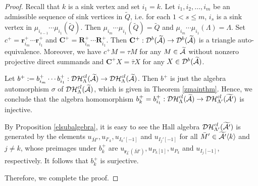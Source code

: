 \documentclass[reqno,12pt]{amsart}
\numberwithin{equation}{section}
\theoremstyle{plain} %
\theoremstyle{definition} %
\begin{document}
\begin{proof}
Recall that $k$ is a sink vertex and set $i_1=k$. Let $i_1,i_2,\ldots, i_m$ be an admissible sequence of sink vertices in $\widetilde{Q}$, i.e. for each $1<s\leq m$, $i_s$ is a sink vertex in $\mu_{i_{s-1}}\cdots \mu_{i_1}(\widetilde{Q})$. Then $\mu_{i_{m}}\cdots \mu_{i_1}(\widetilde{Q})=\widetilde{Q}$ and $\mu_{i_{m}}\cdots \mu_{i_1}(\Lambda)=\Lambda$.
Set $c^+=\mathbf{r}_{i_m}^+\cdots\mathbf{r}_{i_1}^+$ and $\mathbf{C}^+=\mathbf{R}_{i_m}^+\cdots\mathbf{R}_{i_1}^+$.
Then $\mathbf{C}^+:\mathcal{D}^b(\widetilde{\mathcal{A}})\rightarrow\mathcal{D}^b(\widetilde{\mathcal{A}})$ is a triangle auto-equivalence. Moreover, we have $c^+M=\tau M$ for any $M\in\widetilde{\mathcal{A}}$ without nonzero projective direct summands and $\mathbf{C}^+X=\bar{\tau}X$ for any $X\in\mathcal{D}^b(\widetilde{\mathcal{A}})$.

Let ${b}^+:={b}_{i_m}^+\cdots {b}_{i_1}^+:\mathcal{DH}_\Lambda^{cl}(\widetilde{\mathcal{A}})\to \mathcal{DH}_\Lambda^{cl}(\widetilde{\mathcal{A}})$. Then $b^+$ is just the algebra automorphism $\sigma$ of $\mathcal{DH}_\Lambda^{cl}(\widetilde{\mathcal{A}})$, which is given in Theorem \ref{zmainthm}. Hence, we conclude that the algebra homomorphism $b_k^+=b_{i_1}^+:\mathcal{DH}_{\Lambda}^{cl}(\widetilde{\mathcal{A}})\to \mathcal{DH}_{\Lambda'}^{cl}(\widetilde{\mathcal{A}'})$ is injective.

By Proposition \ref{elsubalgebra}, it is easy to see the Hall algebra $\mathcal{DH}_{\Lambda'}^{cl}(\widetilde{\mathcal{A}'})$ is generated by the elements $u_{\bar{M}'}, u_{I'_k}, u_{I_k'[-1]}$ and $ u_{I_j'[-1]}$ for all $\bar{M}'\in\widetilde{\mathcal{A}'}\langle k\rangle$ and $j\neq k$, whose preimages under $b_k^+$ are $u_{\mathbf{r}_k^-(\bar{M}')}, u_{P_k[1]}, u_{P_k}$ and $ u_{I_j[-1]}$, respectively. It follows that $b_k^+$ is surjective.

Therefore, we complete the proof.
\end{proof}
\end{document}
